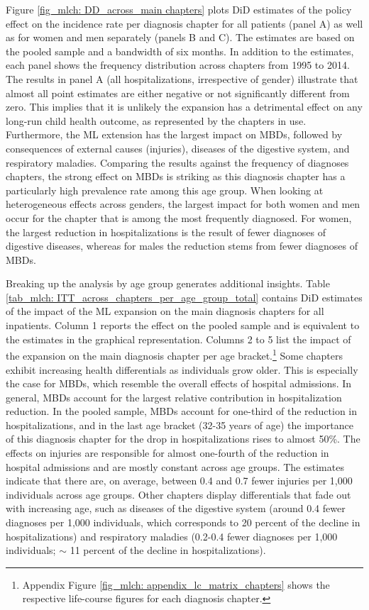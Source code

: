 Figure \ref{fig_mlch: DD_across_main chapters} plots DiD estimates of the policy effect on the incidence rate per diagnosis chapter for all patients (panel A) as well as for women and men separately (panels B and C). The estimates are based on the pooled sample and a bandwidth of six months. In addition to the estimates, each panel shows the frequency distribution across chapters from 1995 to 2014. The results in panel A (all hospitalizations, irrespective of gender) illustrate that almost all point estimates are either negative or not significantly different from zero. This implies that it is unlikely the expansion has a detrimental effect on any long-run child health outcome, as represented by the chapters in use. Furthermore, the ML extension has the largest impact on MBDs, followed by consequences of external causes (injuries), diseases of the digestive system, and respiratory maladies. Comparing the results against the frequency of diagnoses chapters, the strong effect on MBDs is striking as this diagnosis chapter has a particularly high prevalence rate among this age group. When looking at heterogeneous effects across genders, the largest impact for both women and men occur for the chapter that is among the most frequently diagnosed. For women, the largest reduction in hospitalizations is the result of fewer diagnoses of digestive diseases, whereas for males the reduction stems from fewer diagnoses of MBDs. 





Breaking up the analysis by age group generates additional insights. Table \ref{tab_mlch: ITT_across_chapters_per_age_group_total} contains DiD estimates of the impact of the ML expansion on the main diagnosis chapters for all inpatients. Column 1 reports the effect on the pooled sample and is equivalent to the estimates in the graphical representation. Columns 2 to 5 list the impact of the expansion on the main diagnosis chapter per age bracket.\footnote{Appendix Figure \ref{fig_mlch: appendix_lc_matrix_chapters} shows the respective life-course figures for each diagnosis chapter.} Some chapters exhibit increasing health differentials as individuals grow older. This is especially the case for MBDs, which resemble the overall effects of hospital admissions. In general, MBDs account for the largest relative contribution in hospitalization reduction. In the pooled sample, MBDs account for one-third of the reduction in hospitalizations, and in the last age bracket (32-35 years of age) the importance of this diagnosis chapter for the drop in hospitalizations rises to almost 50\%. The effects on injuries are responsible for almost one-fourth of the reduction in hospital admissions and are mostly constant across age groups. The estimates indicate that there are, on average, between 0.4 and 0.7 fewer injuries per 1,000 individuals across age groups. Other chapters display differentials that fade out with increasing age, such as diseases of the digestive system (around 0.4 fewer diagnoses per 1,000 individuals, which corresponds to 20 percent of the decline in hospitalizations) and respiratory maladies (0.2-0.4 fewer diagnoses per 1,000 individuals; $\sim$ 11 percent of the decline in hospitalizations).




